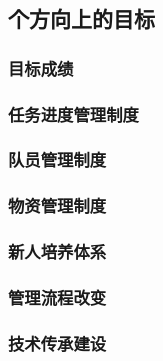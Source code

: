 \subsection{个方向上的目标}

    \subsubsection{目标成绩}

    \subsubsection{任务进度管理制度}

    \subsubsection{队员管理制度}

    \subsubsection{物资管理制度}

    \subsubsection{新人培养体系}

    \subsubsection{管理流程改变}

    \subsubsection{技术传承建设}